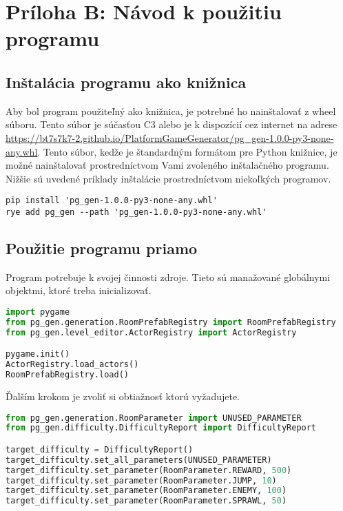 \section*{Príloha B: Návod k použitiu programu}

\subsection*{Inštalácia programu ako knižnica}

Aby bol program použiteľný ako knižnica, je potrebné ho nainštalovať z wheel súboru. Tento súbor je súčasťou C3 alebo je k dispozícií cez internet na adrese \url{https://bt7s7k7-2.github.io/PlatformGameGenerator/pg_gen-1.0.0-py3-none-any.whl}. Tento súbor, kedže je štandardným formátom pre Python knižnice, je možné nainštalovať prostredníctvom Vami zvoleného inštalačného programu. Nižšie sú uvedené príklady inštalácie prostredníctvom niekoľkých programov.

\begin{lstlisting}
pip install 'pg_gen-1.0.0-py3-none-any.whl'
rye add pg_gen --path 'pg_gen-1.0.0-py3-none-any.whl'
\end{lstlisting}


\subsection*{Použitie programu priamo}

Program potrebuje k svojej činnosti zdroje. Tieto sú manažované globálnymi objektmi, ktoré treba inicializovať.

\begin{lstlisting}[language=python]
import pygame
from pg_gen.generation.RoomPrefabRegistry import RoomPrefabRegistry
from pg_gen.level_editor.ActorRegistry import ActorRegistry

pygame.init()
ActorRegistry.load_actors()
RoomPrefabRegistry.load()
\end{lstlisting}

Ďalším krokom je zvoliť si obtiažnosť ktorú vyžadujete.

\begin{lstlisting}[language=python]
from pg_gen.generation.RoomParameter import UNUSED_PARAMETER
from pg_gen.difficulty.DifficultyReport import DifficultyReport

target_difficulty = DifficultyReport()
target_difficulty.set_all_parameters(UNUSED_PARAMETER)
target_difficulty.set_parameter(RoomParameter.REWARD, 500)
target_difficulty.set_parameter(RoomParameter.JUMP, 10)
target_difficulty.set_parameter(RoomParameter.ENEMY, 100)
target_difficulty.set_parameter(RoomParameter.SPRAWL, 50)
\end{lstlisting}



